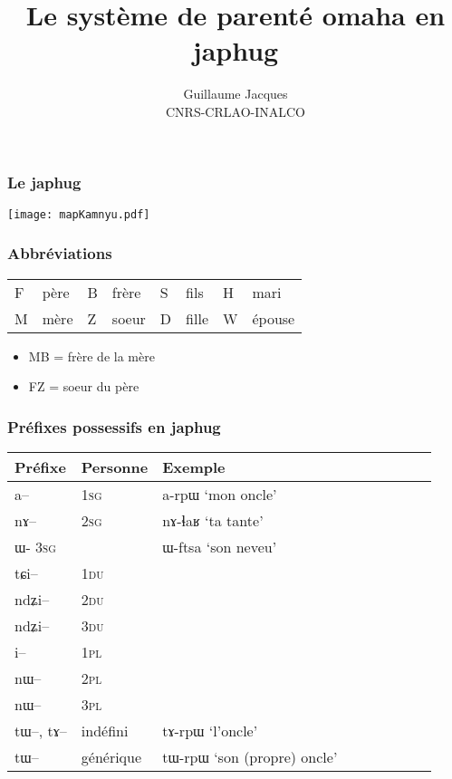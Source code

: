 \documentclass[xcolor=table]{beamer}
\newcommand{\ipa}[1]{{\phon #1}} %
\begin{document}
 
  \begin{frame} 

 
\title{Le système de parenté omaha en japhug}
\author{Guillaume Jacques\\ CNRS-CRLAO-INALCO}
\date{}
\maketitle
\end{frame}   

  \begin{frame} 
 \frametitle{Le japhug} 
 \texttt{[image: mapKamnyu.pdf]}
  \end{frame} 
  
  \begin{frame} 
 \frametitle{Abbréviations} 
 
\begin{tabular}{ll|ll|ll|ll}
\toprule
F & père & B & frère & S & fils & H & mari \\
M & mère & Z & soeur & D & fille & W & épouse \\
\bottomrule
\end{tabular}

\begin{itemize}
\item MB = frère de la mère
\item FZ = soeur du père
\end{itemize}
\end{frame}


  \begin{frame} 
 \frametitle{Préfixes possessifs en japhug} 
 \begin{tabular}{lllllllll} 
\toprule
 Préfixe & Personne & Exemple\\
\midrule
	\ipa{a--}  &		1\textsc{sg} & \ipa{a-rpɯ} `mon oncle' \\
	\ipa{nɤ--}  &			2\textsc{sg} & \ipa{nɤ-ɬaʁ} `ta tante' \\
\ipa{ɯ-}		3\textsc{sg} & & \ipa{ɯ-ftsa} `son neveu'\\
\midrule
\ipa{tɕi--}  &			1\textsc{du}  \\
	\ipa{ndʑi--}  &		2\textsc{du} \\	
\ipa{ndʑi--}  &		3\textsc{du} \\	
\midrule
	\ipa{i--}  &			1\textsc{pl} \\
	\ipa{nɯ--}  &			2\textsc{pl} \\
	\ipa{nɯ--}  &			3\textsc{pl} \\
\midrule
  \ipa{tɯ--},  \ipa{tɤ--} & indéfini & \ipa{tɤ-rpɯ} `l'oncle'\\
  \ipa{tɯ--}   &  générique & \ipa{tɯ-rpɯ} `son (propre) oncle'\\
\bottomrule
\end{tabular}
\end{frame}
\end{document}
